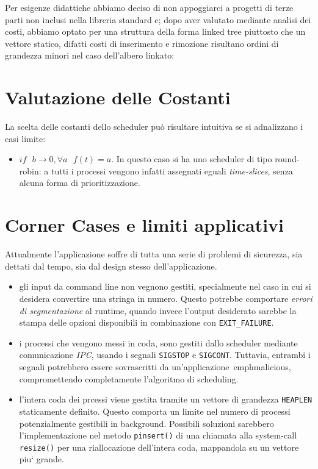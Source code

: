 \documentclass[11pt]{article}
\begin{document}
Per esigenze didattiche abbiamo deciso di non appoggiarci a progetti di terze
parti non inclusi nella libreria standard c; dopo aver valutato mediante analisi
dei costi, abbiamo optato per una struttura della forma linked tree piuttosto
che un vettore statico, difatti costi di inserimento e rimozione risultano
ordini di grandezza minori nel caso dell'albero linkato:

\section{Valutazione delle Costanti}

La scelta delle costanti dello scheduler pu\`o risultare intuitiva se si adnalizzano i casi limite: 
\begin{itemize}
\item $if \ \ \ b \rightarrow 0 , \forall a \ \ \ f(t) = a$. In questo caso si ha uno scheduler di tipo round-robin: a tutti i processi vengono infatti assegnati eguali \emph{time-slices}, senza alcuna forma di prioritizzazione.  
\end{itemize}



\section{Corner Cases e limiti applicativi}

Attualmente l'applicazione soffre di tutta una serie di problemi di sicurezza, sia dettati dal tempo, sia dal design stesso dell'applicazione.
\begin{itemize}
\item gli input da command line non vegnono gestiti, specialmente nel caso in cui si desidera convertire una stringa in numero. Questo potrebbe comportare \emph{errori di segmentazione} al runtime, quando invece l'output
 desiderato sarebbe la stampa delle opzioni disponibili  in combinazione con \texttt{EXIT\_FAILURE}.
 
 \item i processi che vengono messi in coda, sono gestiti dallo scheduler mediante comunicazione \emph{IPC}, usando i segnali \texttt{SIGSTOP} e \texttt{SIGCONT}. Tuttavia, entrambi i segnali potrebbero essere sovrascritti da un'applicazione \,emph{malicious}, compromettendo completamente l'algoritmo di scheduling.  
 
\item l'intera coda dei prcessi viene gestita tramite un vettore di grandezza \texttt{HEAPLEN} staticamente definito. Questo comporta un limite nel numero di processi potenzialmente gestibili in background. Possibili soluzioni sarebbero l'implementazione nel metodo \texttt{pinsert()} di una chiamata alla system-call \texttt{resize()} per una riallocazione dell'intera coda, mappandola su un vettore piu` grande.
\end{itemize}  
\end{document}

